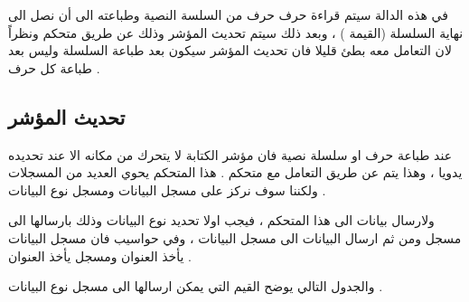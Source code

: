 \documentclass[document.tex]{subfiles}
\begin{document}
\begin{english}
\lstset{numberstyle=\tiny,numbersep=5pt,tabsize=2,extendedchars=true,breaklines=true,frame=b,showspaces=false, showtabs=false,xleftmargin=10pt,framexleftmargin=10pt,framexrightmargin=5pt,framexbottommargin=4pt,showstringspaces=false,language=[x86masm]Assembler}


\end{english}

في هذه الدالة سيتم قراءة حرف حرف من السلسة النصية وطباعته الى أن نصل الى نهاية السلسلة (القيمة ) ، وبعد ذلك سيتم تحديث المؤشر وذلك عن طريق متحكم  ونظراً لان التعامل معه بطئ قليلا فان تحديث المؤشر سيكون بعد طباعة السلسلة وليس بعد طباعة كل حرف .

\subsection{تحديث المؤشر }
عند طباعة حرف او سلسلة نصية فان مؤشر الكتابة لا يتحرك من مكانه الا عند تحديده يدويا ، وهذا يتم عن طريق التعامل مع متحكم  . هذا المتحكم يحوي العديد من المسجلات ولكننا سوف نركز على مسجل البيانات  ومسجل نوع البيانات .

ولارسال بيانات الى هذا المتحكم ، فيجب اولا تحديد نوع البيانات وذلك بارسالها الى مسجل  ومن ثم ارسال البيانات الى مسجل البيانات  ، وفي حواسيب  فان مسجل البيانات يأخذ العنوان  ومسجل  يأخذ العنوان .

والجدول التالي يوضح القيم التي يمكن ارسالها الى مسجل نوع البيانات .
\end{document}
